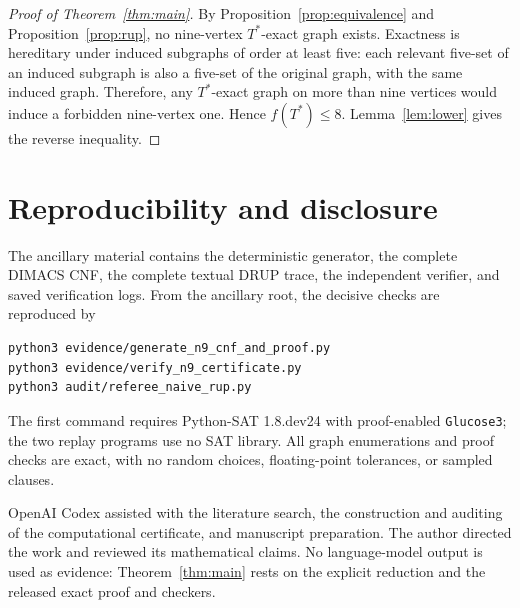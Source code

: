 \documentclass[11pt]{article}
\theoremstyle{definition}
\newcommand{\Tstar}{T^{*}}
\begin{document}
\begin{proof}[Proof of Theorem~\ref{thm:main}]
By Proposition~\ref{prop:equivalence} and
Proposition~\ref{prop:rup}, no nine-vertex \(\Tstar\)-exact graph exists.
Exactness is hereditary under induced subgraphs of order at least five:
each relevant five-set of an induced subgraph is also a five-set of the
original graph, with the same induced graph.  Therefore, any
\(\Tstar\)-exact graph on more than nine vertices would induce a forbidden
nine-vertex one.  Hence \(f(\Tstar)\leq8\).  Lemma~\ref{lem:lower} gives the
reverse inequality.
\end{proof}

\section{Reproducibility and disclosure}

The ancillary material contains the deterministic generator, the complete
DIMACS CNF, the complete textual DRUP trace, the independent verifier, and
saved verification logs.  From the ancillary root, the decisive checks are
reproduced by
\begin{verbatim}
python3 evidence/generate_n9_cnf_and_proof.py
python3 evidence/verify_n9_certificate.py
python3 audit/referee_naive_rup.py
\end{verbatim}
The first command requires Python-SAT 1.8.dev24 with proof-enabled
\texttt{Glucose3}; the two replay programs use no SAT library.  All graph
enumerations and proof checks are exact, with no random choices,
floating-point tolerances, or sampled clauses.

OpenAI Codex assisted with the literature search, the construction and
auditing of the computational certificate, and manuscript preparation.
The author directed the work and reviewed its mathematical claims.  No
language-model output is used as evidence: Theorem~\ref{thm:main} rests on
the explicit reduction and the released exact proof and checkers.



\end{document}
